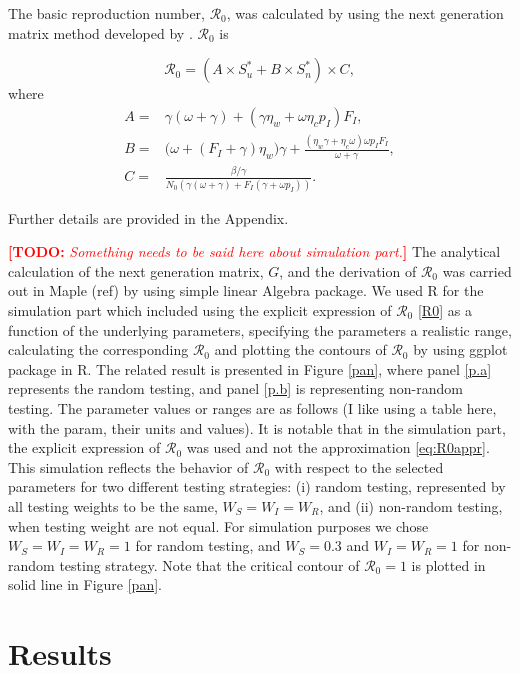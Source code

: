 \documentclass[12pt]{article}
\newcommand{\Rlogo}{R\xspace}
\newcommand{\comment}{\showcomment}
\newcommand{\showcomment}[3]{\textcolor{#1}{\textbf{[#2: }\textsl{#3}\textbf{]}}}
\newcommand{\todo}[1]{\comment{red}{TODO}{#1}}
\newcommand{\Rnum}{\mathcal{R}_0}
\theoremstyle{definition} %
\begin{document}
The basic reproduction number, $\Rnum$, was calculated by using the next generation matrix method developed by \cite{van2002reproduction}. $\Rnum$ is

\begin{equation}
\label{R0}
\Rnum= (A \times S_u^* + B \times S_n^*) \times C, 
\end{equation}
where
\begin{align*}
A=& \gamma(\omega+\gamma) + (\gamma \eta_w + \omega \eta_c p_I) F_I, \\
B=& \big(\omega+(F_I+\gamma)\eta_w\big) \gamma+\frac{(\eta_w \gamma+ \eta_c\omega) \omega p_I F_I }{\omega+\gamma}, \\ 
C=& \frac{\beta/\gamma}{N_0 (\gamma(\omega+\gamma)+F_I(\gamma+\omega p_I))}.
\end{align*}

Further details are provided in the Appendix.
 
\todo{Something needs to be said here about simulation part.} The analytical calculation of the next generation matrix, $G$, and the derivation of $\Rnum$ was carried out in Maple (ref) by using simple linear Algebra package. 
  We used \Rlogo for the simulation part which included using the explicit expression of $\Rnum$ \ref{R0} as a function of the underlying parameters, specifying the parameters a realistic range, calculating the corresponding $\Rnum$ and plotting the contours of $\Rnum$ by using ggplot package in \Rlogo. The related result is presented in Figure \ref{pan}, where  panel \eqref{p.a} represents the random testing, and panel \eqref{p.b} is representing non-random testing. The parameter values or ranges are as follows (I like using a table here, with the param, their units and values). It is notable that in the simulation part, the explicit expression of $\Rnum$ was used and not the approximation \eqref{eq:R0appr}. This simulation reflects the behavior of $\Rnum$ with respect to the selected parameters for two different testing strategies: (i) random testing, represented by all testing weights to be the same, $W_S=W_I=W_R$, and (ii) non-random testing, when testing weight are not equal. For simulation purposes we chose $W_S=W_I=W_R=1$ for random testing, and $W_S=0.3$ and $W_I=W_R=1$ for non-random testing strategy. Note that the critical contour of $\Rnum=1$ is plotted in solid line in Figure \ref{pan}. 

\section{Results}
\end{document}

